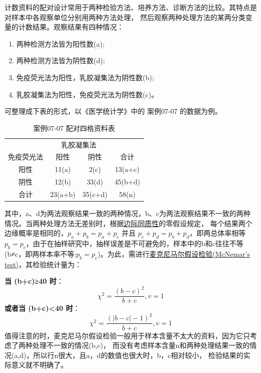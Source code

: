 \documentclass[
]{article}
\providecommand{\tightlist}{%
  \setlength{\itemsep}{0pt}\setlength{\parskip}{0pt}}
\begin{document}
计数资料的配对设计常用于两种检验方法、培养方法、诊断方法的比较。其特点是对样本中各观察单位分别用两种方法处理，
然后观察两种处理方法的某两分类变量的计数结果。观察结果有四种情况：

\begin{enumerate}
\def\labelenumi{\arabic{enumi}.}
\tightlist
\item
  两种检测方法皆为阳性数(a);
\item
  两种检测方法皆为阴性数(d);
\item
  免疫荧光法为阳性，乳胶凝集法为阴性数(b);
\item
  乳胶凝集法为阳性，免疫荧光法为阴性数(c)。
\end{enumerate}

可整理成下表的形式，以《医学统计学》中的 案例07-07 的数据为例。

\begin{table}

\caption{\label{tab:chisqtab2}案例07-07 配对四格资料表}
\centering
\begin{tabular}[t]{cccc}
\toprule
\multicolumn{1}{c}{ } & \multicolumn{2}{c}{乳胶凝集法} & \multicolumn{1}{c}{ } \\
\cmidrule(l{3pt}r{3pt}){2-3}
免疫荧光法 & 阳性 & 阴性 & 合计\\
\midrule
阳性 & 11(a) & 2(c) & 13(a+c)\\
阴性 & 12(b) & 33(d) & 45(b+d)\\
合计 & 23(a+b) & 35(c+d) & 58(n)\\
\bottomrule
\end{tabular}
\end{table}

其中，a、d为两法观察结果一致的两种情况，b、c为两法观察结果不一致的两种情况。当两种处理方法无差别时，根据\href{https://www.statisticssolutions.com/mcnemar-marginal-homogeneity-sign-wilcoxon-tests/}{边际同质性}的零假设规定，
每个结果两个边缘概率是相同的，\(p_a + p_b = p_a + p_c\) 并且 \(p_c + p_d = p_b + p_d\)，即两总体率相等\(p_b=p_c\)，由于在抽样研究中，抽样误差是不可避免的，样本中的b和c往往不等
(b≠c，即两样本率不等:\(p_b=p_c\))。为此，需进行\href{https://en.wikipedia.org/wiki/McNemar\%27s_test}{麦克尼马尔假设检验(McNemar's test)}，其检验统计量为：

\textbf{当 (b+c)≥40 时}：
\[\chi^2=\frac{(b-c)^2}{b+c}, v=1\]
\textbf{或者当 (b+c)\textless40 时}：
\[\chi^2=\frac{(|b-c|-1)^2}{b+c}, v=1\]
值得注意的时，麦克尼马尔假设检验一般用于样本含量不太大的资料，因为它只考虑了两种处理不一致的情况(b,c)，
而没有考虑样本含量n和两种处理结果一致的情况(a,d)，所以行n很大，且a，d的数值也很大时，b，c相对较小，
检验结果的实际意义就不明确了。
\end{document}
